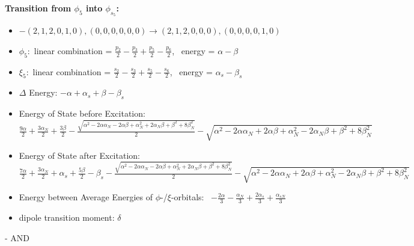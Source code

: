 \documentclass[12pt,a4paper]{article}
\begin{document}
        \noindent\textbf{Transition from $\phi_{5}$ into $\phi_{s_{5}}$:}
        \begin{itemize}
            \item $- (2, 1, 2, 0, 1, 0), (0, 0, 0, 0, 0, 0) \rightarrow (2, 1, 2, 0, 0, 0), (0, 0, 0, 0, 1, 0)$
        
            \item $\phi_{5}:$ linear combination = $\frac{p_{2}}{2} - \frac{p_{3}}{2} + \frac{p_{5}}{2} - \frac{p_{6}}{2}$, \
            energy = $\alpha - \beta$
            
            \item $\xi_{5}:$ linear combination = $\frac{s_{2}}{2} - \frac{s_{3}}{2} + \frac{s_{5}}{2} - \frac{s_{6}}{2}$, \
            energy = $\alpha_{s} - \beta_{s}$
            
            \item $\Delta$ Energy: $- \alpha + \alpha_{s} + \beta - \beta_{s}$
            \item Energy of State before Excitation: $\frac{9 \alpha}{2} + \frac{3 \alpha_{N}}{2} + \frac{3 \beta}{2} - \frac{\sqrt{\alpha^{2} - 2 \alpha \alpha_{N} - 2 \alpha \beta + \alpha_{N}^{2} + 2 \alpha_{N} \beta + \beta^{2} + 8 \beta_{N}^{2}}}{2} - \sqrt{\alpha^{2} - 2 \alpha \alpha_{N} + 2 \alpha \beta + \alpha_{N}^{2} - 2 \alpha_{N} \beta + \beta^{2} + 8 \beta_{N}^{2}}$
            \item Energy of State after Excitation: $\frac{7 \alpha}{2} + \frac{3 \alpha_{N}}{2} + \alpha_{s} + \frac{5 \beta}{2} - \beta_{s} - \frac{\sqrt{\alpha^{2} - 2 \alpha \alpha_{N} - 2 \alpha \beta + \alpha_{N}^{2} + 2 \alpha_{N} \beta + \beta^{2} + 8 \beta_{N}^{2}}}{2} - \sqrt{\alpha^{2} - 2 \alpha \alpha_{N} + 2 \alpha \beta + \alpha_{N}^{2} - 2 \alpha_{N} \beta + \beta^{2} + 8 \beta_{N}^{2}}$
            \item Energy between Average Energies of $\phi$-/$\xi$-orbitals: \
            $- \frac{2 \alpha}{3} - \frac{\alpha_{N}}{3} + \frac{2 \alpha_{s}}{3} + \frac{\alpha_{s N}}{3}$
        
            \item dipole transition moment: $\delta$
        
        \end{itemize}
        
 -  AND 
\end{document}
